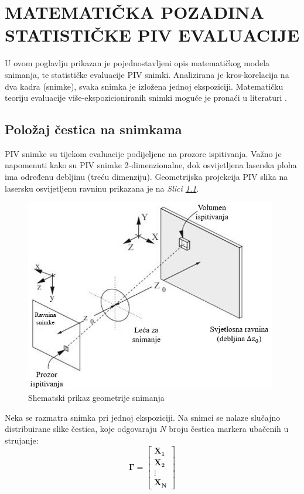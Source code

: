 \chapter{MATEMATIČKA POZADINA STATISTIČKE PIV EVALUACIJE}
\label{chap:Poglavlje_3}
U ovom poglavlju prikazan je pojednostavljeni opis matematičkog modela snimanja, te statističke evaluacije PIV snimki. Analizirana je kros-korelacija na dva kadra (snimke), svaka snimka je izložena jednoj ekspoziciji. Matematičku teoriju evaluacije više-ekspozicioniranih snimki moguće je pronaći u literaturi \cite{raffel2018_book}.
\section{Položaj čestica na snimkama}
PIV snimke su tijekom evaluacije podijeljene na prozore ispitivanja. Važno je napomenuti kako su PIV snimke 2-dimenzionalne, dok osvijetljena laserska ploha ima određenu debljinu (treću dimenziju). Geometrijska projekcija PIV slika na lasersku osvijetljenu ravninu prikazana je na \textit{Slici \ref{sl:3.1}}.
\begin{figure}[h]  
	\centering
	\includegraphics[width=11cm]{./3_MatPozadina/3_1ShemaPIVsnimki.jpg} 
	\caption{Shematski prikaz geometrije snimanja\cite{raffel2018_book}}
	\label{sl:3.1}
\end{figure}
\par
Neka se razmatra snimka pri jednoj ekspoziciji. Na snimci se nalaze slučajno distribuirane slike čestica, koje odgovaraju $N$ broju čestica markera ubačenih u strujanje:
\begin{equation}
	\boldsymbol{\Gamma} = \left[ \begin{array}{c}
						\boldsymbol{X_{1}} \\
						\boldsymbol{X_{2}} \\
						\vdots \\
						\boldsymbol{X_{N}}
					\end{array} \right]
\label{eqn:3.1}
\end{equation}
